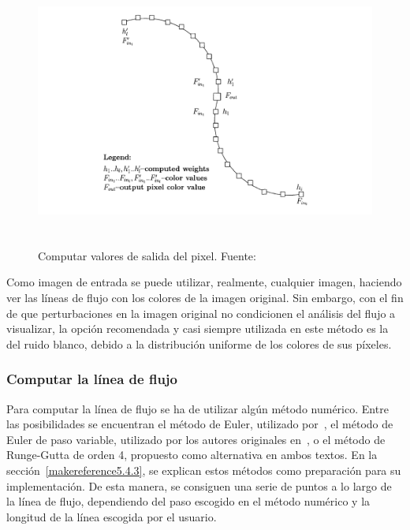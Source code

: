 \begin{figure}
		\centering
		\includegraphics[height=9cm]{figures/licoutputpixel.png}
		\caption[Computar valores de salida del pixel.]{Computar valores de
		salida del pixel. Fuente:~\cite{licthesis}}	
		\label{fig:licoutputpixel}
\end{figure}

Como imagen de entrada se puede utilizar, realmente, cualquier imagen,
haciendo ver las líneas de flujo con los colores de la imagen original. Sin
embargo, con el fin de que perturbaciones en la imagen original no condicionen
el análisis del flujo a visualizar, la opción recomendada y casi siempre
utilizada en este método es la del ruido blanco, debido a la distribución
uniforme de los colores de sus píxeles. 

\subsubsection{Computar la línea de flujo}
\label{ref:streamline}

Para computar la línea de flujo se ha de utilizar algún método numérico. Entre
las posibilidades se encuentran el método de Euler, utilizado
por~\citet{licthesis}, el método de Euler de paso variable, utilizado por los
autores originales en~\citet{osti_10185520}, o el método de Runge-Gutta de orden
4, propuesto como alternativa en ambos textos. En la
sección~\ref{makereference5.4.3}, se explican estos métodos como preparación
para su implementación. De esta manera, se consiguen una serie de puntos a lo
largo de la línea de flujo, dependiendo del paso escogido en el método numérico
y la longitud de la línea escogida por el usuario.

